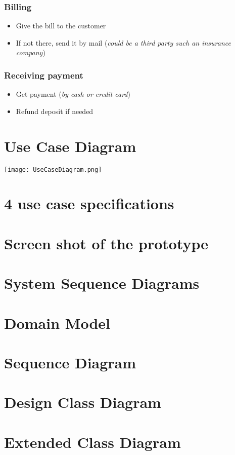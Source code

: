 \documentclass{report}
\begin{document}
\section{Billing}
    \begin{itemize}
        \item Give the bill to the customer
        \item If not there, send it by mail (\textit{could be a third party such an insurance company})
    \end{itemize}

\section{Receiving payment}
    \begin{itemize}
        \item Get payment (\textit{by cash or credit card})
        \item Refund deposit if needed
    \end{itemize}

\part{Use Case Diagram}
\texttt{[image: UseCaseDiagram.png]}

\part{4 use case specifications}
\part{Screen shot of the prototype}
\part{System Sequence Diagrams}
\part{Domain Model}
\part{Sequence Diagram}
\part{Design Class Diagram}
\part{Extended Class Diagram}
\end{document}
